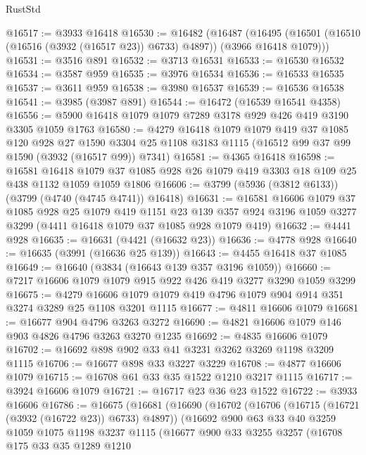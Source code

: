 \begin{lexlean}{RustStd}
\begin{coremodule}
@16517 := @3933 @16418
@16530 := @16482
    (@16487
      (@16495 (@16501 (@16510 (@16516 (@3932 (@16517 @23)) @6733) @4897)) (@3966 @16418 @1079)))
@16531 := @3516 @891
@16532 := @3713 @16531
@16533 := @16530 @16532
@16534 := @3587 @959
@16535 := @3976 @16534
@16536 := @16533 @16535
@16537 := @3611 @959
@16538 := @3980 @16537
@16539 := @16536 @16538
@16541 := @3985 (@3987 @891)
@16544 := @16472 (@16539 @16541 @4358)
@16556 := @5900 @16418 @1079 @1079 @7289 @3178 @929 @426 @419 @3190 @3305 @1059 @1763
@16580 := @4279
    @16418
    @1079
    @1079
    @419
    @37
    @1085
    @120
    @928
    @27
    @1590
    @3304
    @25
    @1108
    @3183
    @1115
    (@16512 @99 @37 @99 @1590 (@3932 (@16517 @99)) @7341)
@16581 := @4365 @16418
@16598 := @16581
    @16418
    @1079
    @37
    @1085
    @928
    @26
    @1079
    @419
    @3303
    @18
    @109
    @25
    @438
    @1132
    @1059
    @1059
    @1806
@16606 := @3799 (@5936 (@3812 @6133)) (@3799 (@4740 (@4745 @4741)) @16418)
@16631 := @16581
    @16606
    @1079
    @37
    @1085
    @928
    @25
    @1079
    @419
    @1151
    @23
    @139
    @357
    @924
    @3196
    @1059
    @3277
    @3299
    (@4411 @16418 @1079 @37 @1085 @928 @1079 @419)
@16632 := @4441 @928
@16635 := @16631 (@4421 (@16632 @23))
@16636 := @4778 @928
@16640 := @16635 (@3991 (@16636 @25 @139))
@16643 := @4455 @16418 @37 @1085
@16649 := @16640 (@3834 (@16643 @139 @357 @3196 @1059))
@16660 := @7217 @16606 @1079 @1079 @915 @922 @426 @419 @3277 @3290 @1059 @3299
@16675 := @4279 @16606 @1079 @1079 @419 @4796 @1079 @904 @914 @351 @3274 @3289 @25 @1108 @3201 @1115
@16677 := @4811 @16606 @1079
@16681 := @16677 @904 @4796 @3263 @3272
@16690 := @4821 @16606 @1079 @146 @903 @4826 @4796 @3263 @3270 @1235
@16692 := @4835 @16606 @1079
@16702 := @16692 @898 @902 @33 @41 @3231 @3262 @3269 @1198 @3209 @1115
@16706 := @16677 @898 @33 @3227 @3229
@16708 := @4877 @16606 @1079
@16715 := @16708 @61 @33 @35 @1522 @1210 @3217 @1115
@16717 := @3924 @16606 @1079
@16721 := @16717 @23 @36 @23 @1522
@16722 := @3933 @16606
@16786 := @16675
    (@16681
      (@16690
        (@16702
          (@16706 (@16715 (@16721 (@3932 (@16722 @23)) @6733) @4897))
          (@16692
            @900
            @63
            @33
            @40
            @3259
            @1059
            @1075
            @1198
            @3237
            @1115
            (@16677
              @900
              @33
              @3255
              @3257
              (@16708
                @175
                @33
                @35
                @1289
                @1210

\end{coremodule}
\end{lexlean}
